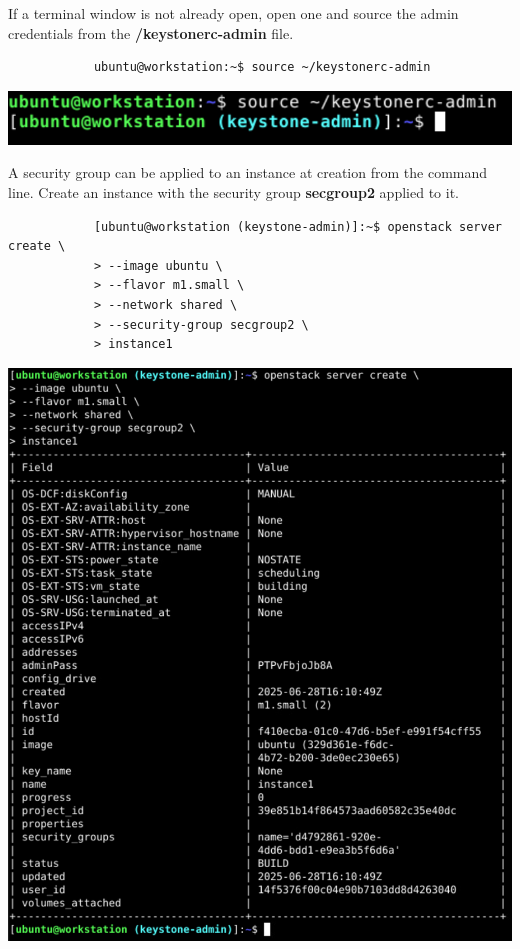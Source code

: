 \documentclass[letterpaper, 12pt]{article}
\begin{document}
\begin{enumerate}
    \begin{labstep}
        If a terminal window is not already open, open one and source the admin credentials from the \textbf{\texttildemid/keystonerc-admin} file.
        \begin{lstlisting}
            ubuntu@workstation:~$ source ~/keystonerc-admin
        \end{lstlisting}

        \begin{center}
            \includegraphics[width=\linewidth]{images/part2/step1.png}
        \end{center}
    \end{labstep}

    \begin{labstep}
        A security group can be applied to an instance at creation from the command line.
        Create an instance with the security group \textbf{secgroup2} applied to it.
        \begin{lstlisting}
            [ubuntu@workstation (keystone-admin)]:~$ openstack server create \
            > --image ubuntu \
            > --flavor m1.small \
            > --network shared \
            > --security-group secgroup2 \
            > instance1
        \end{lstlisting}

        \begin{center}
            \includegraphics[width=\linewidth]{images/part2/step2.png}
        \end{center}
    \end{labstep}


\end{enumerate}
\end{document}
